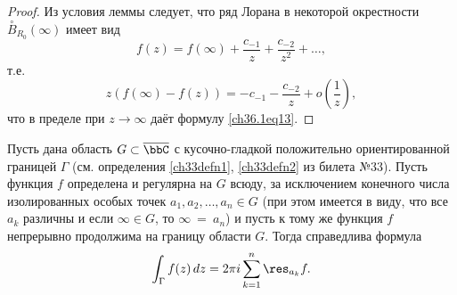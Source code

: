 \begin{proof}
Из условия леммы следует, что ряд Лорана в некоторой окрестности $\overset{\circ}{B}_{R_0}(\infty)$ имеет вид
$$
f(z) = f(\infty) + \frac{c_{-1}}{z} + \frac{c_{-2}}{z^2} + \ldots,
$$
т.е.
$$
z(f(\infty) - f(z)) = -c_{-1} - \frac{c_{-2}}{z} + o\left(\frac{1}{z}\right),
$$
что в пределе при $z \to \infty$ даёт формулу \eqref{ch36.1eq13}.	
\end{proof}

\begin{thm}  \label{ch36.1T1}
Пусть дана область $G \subset \overline{\bbC}$ с кусочно-гладкой положительно ориентированной границей $\Gamma$ (см. определения \ref{ch33defn1}, \ref{ch33defn2} из билета №33). Пусть функция $f$ определена и регулярна на $G$ всюду, за исключением конечного числа изолированных особых точек $a_1,a_2,\ldots,a_n \in G$ (при этом имеется в виду, что все $a_k$ различны и если $\infty \in G$, то $\infty\ =\ a_n$) и пусть к тому же функция $f$ непрерывно продолжима на границу области $G$. Тогда справедлива формула
\begin{equation} \label{ch36.1eq14}
\int_\Gamma f(z) \,dz = 2 \pi i \sum_{k = 1}^{n} \res_{a_k} f.
\end{equation}
\end{thm}


